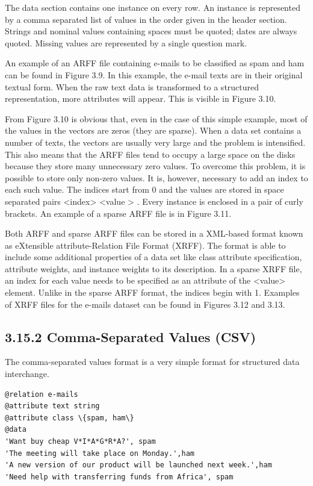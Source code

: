\documentclass[10pt]{book}
\begin{document}
The data section contains one instance on every row. An instance is represented by a comma separated list of values in the order given in the header section. Strings and nominal values containing spaces must be quoted; dates are always quoted. Missing values are represented by a single question mark.

An example of an ARFF file containing e-mails to be classified as spam and ham can be found in Figure 3.9. In this example, the e-mail texts are in their original textual form. When the raw text data is transformed to a structured representation, more attributes will appear. This is visible in Figure 3.10.

From Figure 3.10 is obvious that, even in the case of this simple example, most of the values in the vectors are zeros (they are sparse). When a data set contains a number of texts, the vectors are usually very large and the problem is intensified. This also means that the ARFF files tend to occupy a large space on the disks because they store many unnecessary zero values. To overcome this problem, it is possible to store only non-zero values. It is, however, necessary to add an index to each such value. The indices start from 0 and the values are stored in space separated pairs <index> <value > . Every instance is enclosed in a pair of curly brackets. An example of a sparse ARFF file is in Figure 3.11.

Both ARFF and sparse ARFF files can be stored in a XML-based format known as eXtensible attribute-Relation File Format (XRFF). The format is able to include some additional properties of a data set like class attribute specification, attribute weights, and instance weights to its description. In a sparse XRFF file, an index for each value needs to be specified as an attribute of the <value> element. Unlike in the sparse ARFF format, the indices begin with 1. Examples of XRFF files for the e-mails dataset can be found in Figures 3.12 and 3.13.

\subsection*{3.15.2 Comma-Separated Values (CSV)}
The comma-separated values format is a very simple format for structured data interchange.

\begin{verbatim}
@relation e-mails
@attribute text string
@attribute class \{spam, ham\}
@data
'Want buy cheap V*I*A*G*R*A?', spam
'The meeting will take place on Monday.',ham
'A new version of our product will be launched next week.',ham
'Need help with transferring funds from Africa', spam
\end{verbatim}
\end{document}

